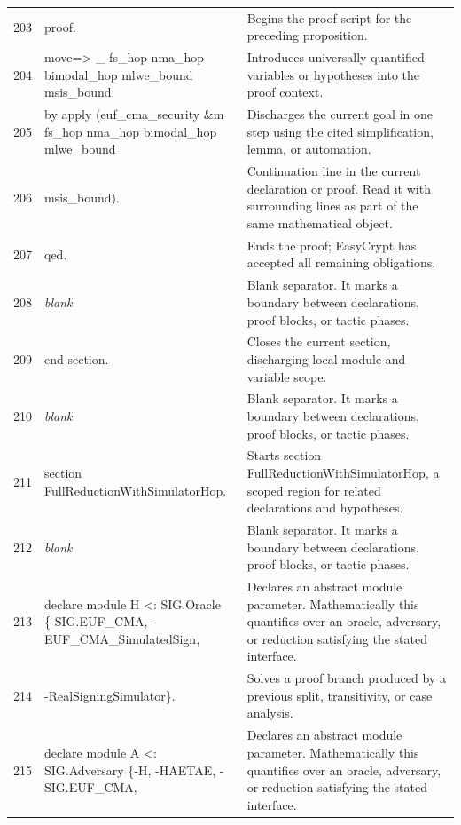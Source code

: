 \documentclass[10pt]{article}
\begin{document}
\begin{longtable}{r L{0.53\textwidth} L{0.37\textwidth}}
203 & {\ttfamily\scriptsize proof.} & Begins the proof script for the preceding proposition. \\
204 & {\ttfamily\scriptsize move=> \_ fs\_hop nma\_hop bimodal\_hop mlwe\_bound msis\_bound.} & Introduces universally quantified variables or hypotheses into the proof context. \\
205 & {\ttfamily\scriptsize by apply (euf\_cma\_security \&m fs\_hop nma\_hop bimodal\_hop mlwe\_bound} & Discharges the current goal in one step using the cited simplification, lemma, or automation. \\
206 & {\ttfamily\scriptsize           msis\_bound).} & Continuation line in the current declaration or proof.  Read it with surrounding lines as part of the same mathematical object. \\
207 & {\ttfamily\scriptsize qed.} & Ends the proof; EasyCrypt has accepted all remaining obligations. \\
208 & {\ttfamily\scriptsize \emph{blank}} & Blank separator.  It marks a boundary between declarations, proof blocks, or tactic phases. \\
209 & {\ttfamily\scriptsize end section.} & Closes the current section, discharging local module and variable scope. \\
210 & {\ttfamily\scriptsize \emph{blank}} & Blank separator.  It marks a boundary between declarations, proof blocks, or tactic phases. \\
211 & {\ttfamily\scriptsize section FullReductionWithSimulatorHop.} & Starts section FullReductionWithSimulatorHop, a scoped region for related declarations and hypotheses. \\
212 & {\ttfamily\scriptsize \emph{blank}} & Blank separator.  It marks a boundary between declarations, proof blocks, or tactic phases. \\
213 & {\ttfamily\scriptsize declare module H <: SIG.Oracle \{-SIG.EUF\_CMA, -EUF\_CMA\_SimulatedSign,} & Declares an abstract module parameter.  Mathematically this quantifies over an oracle, adversary, or reduction satisfying the stated interface. \\
214 & {\ttfamily\scriptsize                                  -RealSigningSimulator\}.} & Solves a proof branch produced by a previous split, transitivity, or case analysis. \\
215 & {\ttfamily\scriptsize declare module A <: SIG.Adversary \{-H, -HAETAE, -SIG.EUF\_CMA,} & Declares an abstract module parameter.  Mathematically this quantifies over an oracle, adversary, or reduction satisfying the stated interface. \\

\end{longtable}
\end{document}
